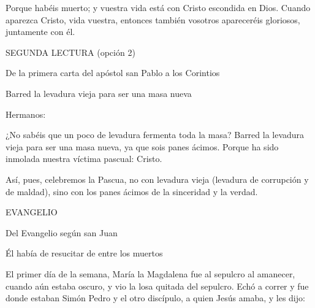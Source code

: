 			\begin{readbody}Porque habéis muerto; y vuestra vida está con Cristo escondida en Dios. Cuando aparezca Cristo, vida vuestra, entonces también vosotros apareceréis gloriosos, juntamente con él.\end{readbody}
			
			\begin{readtitle}SEGUNDA LECTURA (opción 2)\end{readtitle}
			
			\begin{readbook}De la primera carta del apóstol san Pablo a los Corintios \end{readbook}
			
			\begin{readtheme}Barred la levadura vieja para ser una masa nueva\end{readtheme}
			
			\begin{readbody}Hermanos: \end{readbody}
			
			\begin{readbody}¿No sabéis que un poco de levadura fermenta toda la masa? Barred la levadura vieja para ser una masa nueva, ya que sois panes ácimos. Porque ha sido inmolada nuestra víctima pascual: Cristo. \end{readbody}
			
			\begin{readbody}Así, pues, celebremos la Pascua, no con levadura vieja (levadura de corrupción y de maldad), sino con los panes ácimos de la sinceridad y la verdad.\end{readbody}
			
			\begin{readtitle}EVANGELIO\end{readtitle}
			
			\begin{readbook}Del Evangelio según san Juan \end{readbook}
			
			\begin{readtheme}Él había de resucitar de entre los muertos\end{readtheme}
			
			\begin{readbody}El primer día de la semana, María la Magdalena fue al sepulcro al amanecer, cuando aún estaba oscuro, y vio la losa quitada del sepulcro. Echó a correr y fue donde estaban Simón Pedro y el otro discípulo, a quien Jesús amaba, y les dijo: \end{readbody}
			
